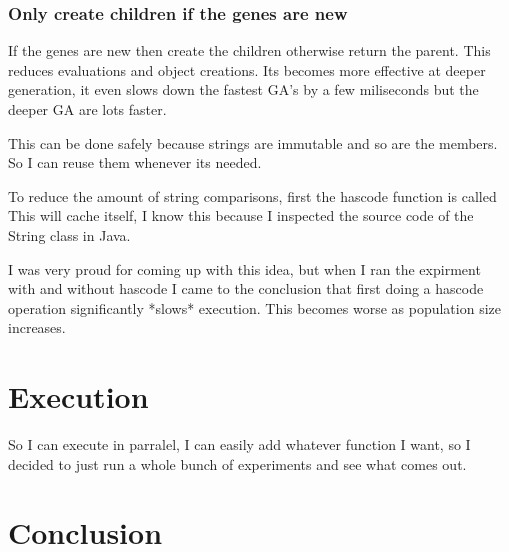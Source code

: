 \documentclass{article}
\begin{document}
\subsubsection{Only create children if the genes are new}
If the genes are new then create the children otherwise return the parent.
This reduces evaluations and object creations. Its becomes more effective
at deeper generation, it even slows down the fastest GA's by a few miliseconds
but the deeper GA are lots faster.

This can be done safely because strings are immutable and so are the members.
So I can reuse them whenever its needed.

To reduce the amount of string comparisons, first the hascode function is called
This will cache itself, I know this because I inspected the source code of the
String class in Java.

I was very proud for coming up with  this idea, but when I ran the expirment with
and without hascode I came to the conclusion that first doing a hascode operation
significantly *slows* execution. This becomes worse as population size increases.

\section{Execution}
So I can execute in parralel, I can easily add whatever function I want, so
I decided to just run a whole bunch of experiments and see what comes out.



\section{Conclusion}
\end{document}
